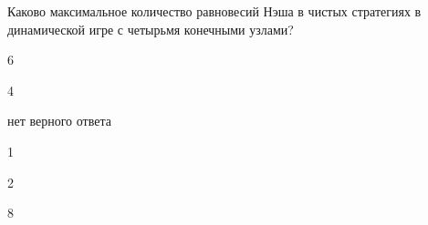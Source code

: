 
\begin{question}
Каково максимальное количество равновесий Нэша в чистых стратегиях в
динамической игре с четырьмя конечными узлами?
\begin{answerlist}
  \item 6
  \item 4
  \item нет верного ответа
  \item 1
  \item 2
  \item 8
\end{answerlist}
\end{question}


